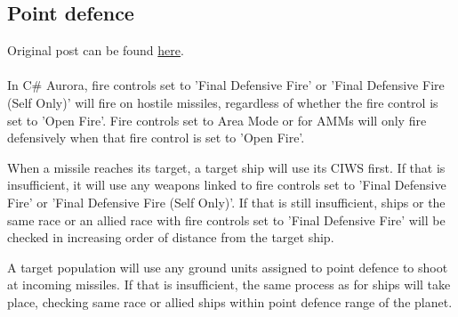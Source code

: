 \documentclass[../../Aurora C# unofficial manual.tex]{subfiles}
\begin{document}
	\subsection{Point defence}
	Original post can be found
	\href{http://aurora2.pentarch.org/index.php?topic=8495.msg107268#msg107268}{here}.
	\\\\
	
	In C\# Aurora, fire controls set to 'Final Defensive Fire' or 'Final Defensive Fire (Self Only)' will fire on hostile missiles, regardless of whether the fire control is set to 'Open Fire'. Fire controls set to Area Mode or for AMMs will only fire defensively when that fire control is set to 'Open Fire'.
	
	When a missile reaches its target, a target ship will use its CIWS first. If that is insufficient, it will use any weapons linked to fire controls set to 'Final Defensive Fire' or 'Final Defensive Fire (Self Only)'. If that is still insufficient, ships or the same race or an allied race with fire controls set to 'Final Defensive Fire' will be checked in increasing order of distance from the target ship.
	
	A target population will use any ground units assigned to point defence to shoot at incoming missiles. If that is insufficient, the same process as for ships will take place, checking same race or allied ships within point defence range of the planet.
\end{document}
